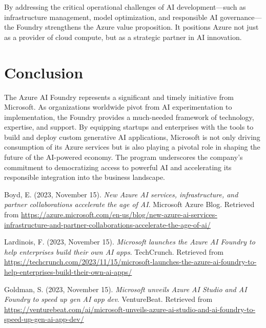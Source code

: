 \documentclass[12pt, a4paper]{article}
\begin{document}
By addressing the critical operational challenges of AI development—such as infrastructure management, model optimization, and responsible AI governance—the Foundry strengthens the Azure value proposition. It positions Azure not just as a provider of cloud compute, but as a strategic partner in AI innovation.

\section{Conclusion}
The Azure AI Foundry represents a significant and timely initiative from Microsoft. As organizations worldwide pivot from AI experimentation to implementation, the Foundry provides a much-needed framework of technology, expertise, and support. By equipping startups and enterprises with the tools to build and deploy custom generative AI applications, Microsoft is not only driving consumption of its Azure services but is also playing a pivotal role in shaping the future of the AI-powered economy. The program underscores the company's commitment to democratizing access to powerful AI and accelerating its responsible integration into the business landscape.

\begin{thebibliography}{9}

Boyd, E. (2023, November 15). \textit{New Azure AI services, infrastructure, and partner collaborations accelerate the age of AI}. Microsoft Azure Blog. Retrieved from \url{https://azure.microsoft.com/en-us/blog/new-azure-ai-services-infrastructure-and-partner-collaborations-accelerate-the-age-of-ai/}

Lardinois, F. (2023, November 15). \textit{Microsoft launches the Azure AI Foundry to help enterprises build their own AI apps}. TechCrunch. Retrieved from \url{https://techcrunch.com/2023/11/15/microsoft-launches-the-azure-ai-foundry-to-help-enterprises-build-their-own-ai-apps/}

Goldman, S. (2023, November 15). \textit{Microsoft unveils Azure AI Studio and AI Foundry to speed up gen AI app dev}. VentureBeat. Retrieved from \url{https://venturebeat.com/ai/microsoft-unveils-azure-ai-studio-and-ai-foundry-to-speed-up-gen-ai-app-dev/}

\end{thebibliography}
\end{document}
